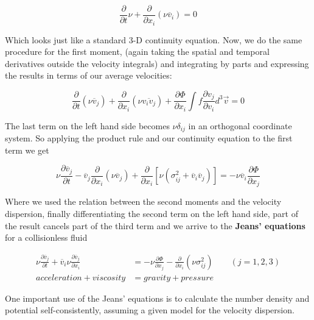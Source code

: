 \begin{equation}
\frac{\partial}{\partial t}\nu+\frac{\partial}{\partial x_{i}}(\nu \overline{v}_{i})=0
\end{equation}

Which looks just like a standard 3-D continuity equation. Now, we do the same procedure for the first moment, (again taking the spatial and temporal derivatives outside the velocity integrals) and integrating by parts and expressing the results in terms of our average velocities:

\begin{equation}
\frac{\partial}{\partial t}(\nu \overline{v}_{j})+\frac{\partial}{\partial x_{i}}(\nu \overline{v_{i}v_{j}})+\frac{\partial \Phi}{\partial x_{i}}\int f\frac{\partial v_{j}}{\partial v_{i}}d^{3}\vec{v}=0
\end{equation} 

The last term on the left hand side becomes $\nu \delta_{ij}$ in an orthogonal coordinate system. So applying the product rule and our continuity equation to the first term we get

\begin{equation}
\nu \frac{\partial \overline{v}_{j}}{\partial t}-\overline{v}_{j}\frac{\partial}{\partial x_{i}}(\nu \overline{v}_{j})+\frac{\partial}{\partial x_{i}}[\nu(\sigma_{ij}^{2}+\overline{v}_{i}\overline{v}_{j})]=-\nu \overline{v}_{i}\frac{\partial \Phi}{\partial x_{j}}
\end{equation}

Where we used the relation between the second moments and the velocity dispersion, finally differentiating the second term on the left hand side, part of the result cancels part of the third term and we arrive to the \textbf{Jeans' equations} for a collisionless fluid

\begin{equation}
\begin{aligned}	
	\nu \frac{\partial \overline{v}_j}{\partial t} + \overline{v}_i\nu \frac{\partial\overline{v}_j}{\partial x_{i}} &= -\nu \frac{\partial\Phi}{\partial x_{j}}-\frac{\partial}{\partial x_{i}}(\nu \sigma_{ij}^{2})\quad\quad (j=1,2,3) \\     acceleration + viscosity &= gravity + pressure
	\end{aligned}
\end{equation}

One important use of the Jeans' equations is to calculate the number density and potential self-consistently, assuming
a given model for the velocity dispersion.

